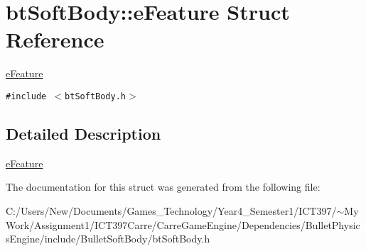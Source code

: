 \hypertarget{structbt_soft_body_1_1e_feature}{
\section{btSoftBody::eFeature Struct Reference}
\label{structbt_soft_body_1_1e_feature}
}
\hyperlink{structbt_soft_body_1_1e_feature}{eFeature}  


{\tt \#include $<$btSoftBody.h$>$}



\subsection{Detailed Description}
\hyperlink{structbt_soft_body_1_1e_feature}{eFeature} 

The documentation for this struct was generated from the following file:\begin{CompactItemize}
\item 
C:/Users/New/Documents/Games\_\-Technology/Year4\_\-Semester1/ICT397/$\sim$My Work/Assignment1/ICT397Carre/CarreGameEngine/Dependencies/BulletPhysicsEngine/include/BulletSoftBody/btSoftBody.h\end{CompactItemize}
